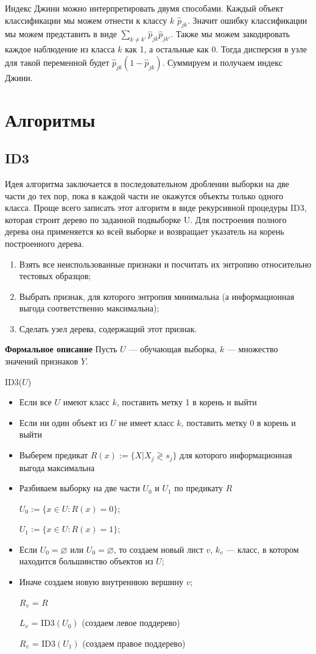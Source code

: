 \documentclass[14pt, a4paper]{article}
\begin{document}
Индекс Джини можно интерпретировать двумя способами. Каждый объект классификации мы можем отнести к классу $k$ $\hat{p}_{jk}$. Значит ошибку классификации мы можем представить в виде $\sum_{k \neq k'} \hat{p}_{jk} \hat{p}_{jk'}$. Также мы можем закодировать каждое наблюдение из класса $k$ как 1, а остальные как 0. Тогда дисперсия в узле для такой переменной будет $\hat{p}_{jk}(1-\hat{p}_{jk})$. Суммируем и получаем индекс Джини.


\section{Алгоритмы}

\subsection{ID3}
Идея алгоритма заключается в последовательном дроблении выборки на две части до тех пор, пока в каждой части не окажутся объекты только одного класса. Проще всего записать этот алгоритм в виде рекурсивной процедуры ID3, которая строит дерево по заданной подвыборке U. Для построения полного дерева она применяется ко всей выборке и возвращает указатель на корень построенного дерева.

\begin{enumerate}
\item Взять все неиспользованные признаки и посчитать их энтропию относительно тестовых образцов;
\item Выбрать признак, для которого энтропия минимальна (а информационная выгода соответственно максимальна);
\item Сделать узел дерева, содержащий этот признак.
\end{enumerate}

\textbf{Формальное описание}
Пусть $U$ --- обучающая выборка, $k$ --- множество значений признаков $Y$.

ID3($U$)
\begin{itemize}
\item Если все $U$ имеют класс $k$, поставить метку 1 в корень и выйти
\item Если ни один объект из $U$ не имеет класс $k$, поставить метку 0 в корень и выйти
\item Выберем предикат $R(x) := \{X| X_j \gtrless s_j \}$ для которого информационная выгода максимальна
\item Разбиваем выборку на две части $U_0$ и $U_1$ по предикату $R$

	$U_0 := \{x \in U: R(x) = 0 \}$;
	
	$U_1 := \{x \in U: R(x) = 1 \}$;
\item Если $U_0 = \varnothing$ или $U_0 = \varnothing$, то создаем новый лист $v$, $k_v$ --- класс, в котором находится большинство объектов из $U$;
\item Иначе создаем новую внутреннюю вершину $v$;

		$R_v$ = $R$

		$L_v$ = ID3$(U_0)$ (создаем левое поддерево)
		
		$R_v$ = ID3$(U_1)$ (создаем правое поддерево)
\end{itemize}
\end{document}
